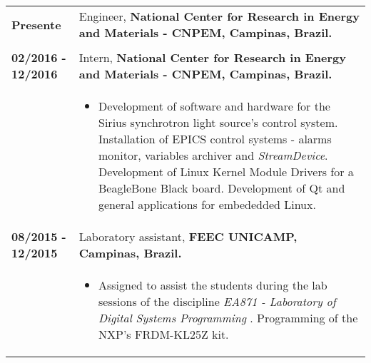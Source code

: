 \documentclass[10pt, a4paper]{article}
\begin{document}
\begin{tabular}{p{} p{}}

\textbf{Presente}  & Engineer, \textbf{National Center for Research in
Energy and Materials - CNPEM, Campinas, Brazil.}
\\
& \vspace{-12pt}
\\

\textbf{02/2016 - 12/2016}  & Intern, \textbf{National Center for Research in
Energy and Materials - CNPEM, Campinas, Brazil.}
 \\
  & \vspace{-12pt}
  \begin{itemize}
    \item Development of software and hardware for the Sirius synchrotron light
    source's control system. Installation of EPICS
    control systems - alarms monitor, variables archiver and \textit{StreamDevice}.
    Development of Linux Kernel Module Drivers for a BeagleBone Black board.
    Development of Qt and general applications for
    embededded Linux.
    
	\end{itemize}\\

\textbf{08/2015 - 12/2015}  & Laboratory assistant, \textbf{FEEC
 UNICAMP, Campinas, Brazil.}
 \\
  & \vspace{-12pt}
  \begin{itemize}
    \item Assigned to assist the students during the lab sessions of the
    discipline \textit{EA871 - Laboratory of Digital Systems Programming
    }. Programming of the NXP's FRDM-KL25Z kit.
        
	\end{itemize}\\




\end{tabular}
\end{document}
